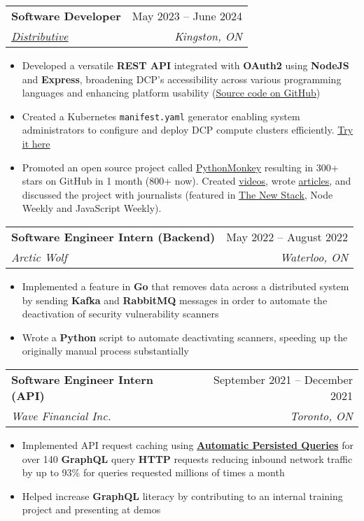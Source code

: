 \documentclass[letterpaper,11pt]{article}
\makeatletter
\newcommand{\resumeItem}[1]{
  \item\small{
    {#1 \vspace{-2pt}}
  }
}
\newcommand{\resumeSubheading}[4]{
  \vspace{-2pt}\item
    \begin{tabular*}{0.97\textwidth}[t]{l@{\extracolsep{\fill}}r}
      \textbf{#1} & #2 \\
      \textit{\small#3} & \textit{\small #4} \\
    \end{tabular*}\vspace{-7pt}
}
\newcommand{\resumeItemListStart}{\begin{itemize}}
\newcommand{\resumeItemListEnd}{\end{itemize}\vspace{-5pt}}
\makeatother
\begin{document}
    \resumeSubheading
      {Software Developer}{May 2023 -- June 2024}
      {\href{https://distributive.network/}{\underline{Distributive}}}{Kingston, ON}
      \resumeItemListStart 
        \resumeItem{Developed a versatile \textbf{REST API} integrated with \textbf{OAuth2} using \textbf{NodeJS} and \textbf{Express}, broadening DCP's accessibility across various programming languages and enhancing platform usability (\href{https://github.com/Distributive-Network/dcp-rest}{\underline{Source code on GitHub}})}
        \resumeItem{Created a Kubernetes \texttt{manifest.yaml} generator enabling system administrators to configure and deploy DCP compute clusters efficiently. \href{https://distributive.network/docker}{\underline{Try it here}}}
        \resumeItem{Promoted an open source project called \href{https://github.com/Distributive-Network/PythonMonkey}{\underline{PythonMonkey}} resulting in 300+ stars on GitHub in 1 month (800+ now). Created \href{https://youtu.be/UmlSryXsh30}{\underline{videos}}, wrote \href{https://distributive.network/jobs/python-monkey}{\underline{articles}}, and discussed the project with journalists (featured in \href{https://thenewstack.io/python-meets-javascript-wasm-with-the-magic-of-pythonmonkey/}{\underline{The New Stack}}, Node Weekly and JavaScript Weekly).}
      \resumeItemListEnd

    \resumeSubheading
      {Software Engineer Intern (Backend)}{May 2022 -- August 2022}
      {Arctic Wolf}{Waterloo, ON}
      \resumeItemListStart 
        \resumeItem{Implemented a feature in \textbf{Go} that removes data across a distributed system by sending \textbf{Kafka} and \textbf{RabbitMQ} messages in order to automate the deactivation of security vulnerability scanners}
        \resumeItem{Wrote a \textbf{Python} script to automate deactivating scanners, speeding up the originally manual process substantially}
      \resumeItemListEnd


    \resumeSubheading
      {Software Engineer Intern (API)}{September 2021 -- December 2021}
      {Wave Financial Inc.}{Toronto, ON}
      \resumeItemListStart 
        \resumeItem{Implemented API request caching using \href{https://www.apollographql.com/docs/apollo-server/performance/apq/}{\textbf{Automatic Persisted Queries}} for over 140 \textbf{GraphQL} query \textbf{HTTP} requests reducing inbound network traffic by up to 93\% for queries requested millions of times a month}
        \resumeItem{Helped increase \textbf{GraphQL} literacy by contributing to an internal training project and presenting at demos}
      \resumeItemListEnd
    
\end{document}

